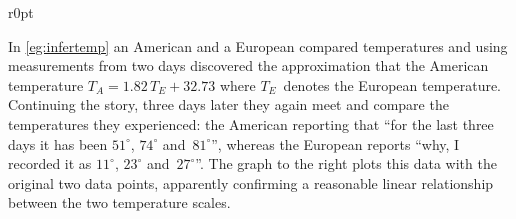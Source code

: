 \begin{wrapfigure}[8]r{0pt}
\end{wrapfigure}
\begin{example} \label{eg:infertemp2}
In \cref{eg:infertemp} an American and a European compared temperatures and using measurements from two days discovered the approximation that the American temperature \(T_A=1.82\,T_E+32.73\) where \(T_E\)~denotes the European temperature.
Continuing the story, three days later they again meet and compare the temperatures they experienced: the American reporting that ``for the last three days it has been \(51^\circ\), \(74^\circ\) and~\(81^\circ\)'', whereas the European reports ``why, I recorded it as \(11^\circ\), \(23^\circ\) and~\(27^\circ\)''.
The graph to the right plots this data with the original two data points, apparently confirming a reasonable linear relationship between the two temperature scales.


\end{example}
